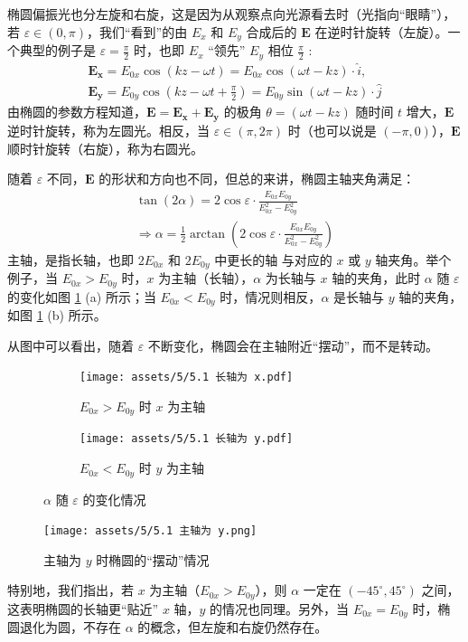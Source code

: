\documentclass[UTF8]{report}
\theoremstyle{MyLineTheoremStyle} %
\theoremstyle{MyBlockTheoremStyle} %
\theoremstyle{MySubsubsectionStyle} %
\begin{document}
椭圆偏振光也分左旋和右旋，这是因为从观察点向光源看去时（光指向“眼睛”），若 $\varepsilon \in (0, \pi)$，我们“看到”的由 $E_x$ 和 $E_y$ 合成后的 $\boldsymbol{E}$ 在逆时针旋转（左旋）。一个典型的例子是 $\varepsilon = \frac{\pi}{2}$ 时，也即 $E_x$ “领先” $E_y$ 相位 $\frac{\pi}{2}$ :
\begin{gather}
\boldsymbol{E_x} = E_{0x} \cos (kz - \omega t) = E_{0x} \cos (\omega t - kz) \cdot \hat{i},\quad \\ 
\boldsymbol{E_y} = E_{0y} \cos (kz - \omega t + \frac{\pi}{2}) 
= E_{0y} \sin (\omega t - kz) \cdot \hat{j}
\end{gather}
由椭圆的参数方程知道，$\boldsymbol{E} = \boldsymbol{E_x} + \boldsymbol{E_y}$ 的极角 $\theta = (\omega t - kz)$ 随时间 $t$ 增大，$\boldsymbol{E}$ 逆时针旋转，称为左圆光。相反，当 $\varepsilon \in (\pi, 2\pi)$ 时（也可以说是 $(-\pi, 0)$），$\boldsymbol{E}$ 顺时针旋转（右旋），称为右圆光。

随着 $\varepsilon$ 不同，$\boldsymbol{E}$ 的形状和方向也不同，但总的来讲，椭圆主轴夹角满足：
\begin{gather}
\tan \left(2 \alpha\right) = 2 \cos \varepsilon \cdot \frac{E_{0x}E_{0y}}{E_{0x}^2 - E_{0y}^2} \\ 
\Longrightarrow \alpha = \frac{1}{2} \arctan \left(2 \cos \varepsilon \cdot \frac{E_{0x}E_{0y}}{E_{0x}^2 - E_{0y}^2}\right)
\end{gather}
主轴，是指长轴，也即 $2E_{0x}$ 和 $2E_{0y}$ 中更长的轴{\color{red} 与对应的 $x$ 或 $y$ 轴夹角}。举个例子，当 $E_{0x} > E_{0y}$ 时，$x$ 为主轴（长轴），$\alpha$ 为长轴与 $x$ 轴的夹角，此时 $\alpha$ 随 $\varepsilon$ 的变化如图 \ref{fig:alpha} (a) 所示；当 $E_{0x} < E_{0y}$ 时，情况则相反，$\alpha$ 是长轴与 $y$ 轴的夹角，如图 \ref{fig:alpha} (b) 所示。

从图中可以看出，随着 $\varepsilon$ 不断变化，椭圆会在主轴附近“摆动”，而不是转动。
\begin{figure}[H]\centering
\begin{subfigure}[b]{0.5\columnwidth}\centering
    \texttt{[image: assets/5/5.1 长轴为 x.pdf]}
    \caption{$E_{0x} > E_{0y}$ 时 $x$ 为主轴}
\end{subfigure}\hfill
\begin{subfigure}[b]{0.5\columnwidth}\centering
    \texttt{[image: assets/5/5.1 长轴为 y.pdf]}
    \caption{$E_{0x} < E_{0y}$ 时 $y$ 为主轴}
\end{subfigure}
\caption{$\alpha$ 随 $\varepsilon$ 的变化情况}
\label{fig:alpha}
\end{figure}
\begin{figure}[H]\centering
    \texttt{[image: assets/5/5.1 主轴为 y.png]}
    \caption{主轴为 $y$ 时椭圆的“摆动”情况}
\end{figure}
特别地，我们指出，若 $x$ 为主轴（$E_{0x} > E_{0y}$），则 $\alpha$ 一定在 $(-45^\circ, 45^\circ)$ 之间，这表明椭圆的长轴更“贴近” $x$ 轴，$y$ 的情况也同理。另外，当 $E_{0x} = E_{0y}$ 时，椭圆退化为圆，不存在 $\alpha$ 的概念，但左旋和右旋仍然存在。
\end{document}
